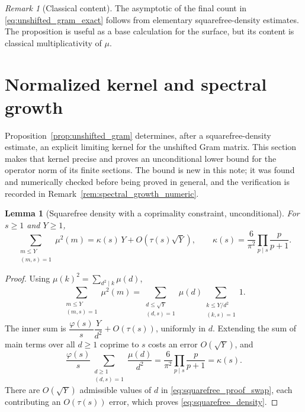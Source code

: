 \documentclass[11pt]{amsart}
\numberwithin{equation}{section}
\theoremstyle{plain}
\newtheorem{lemma}[theorem]{Lemma}
\theoremstyle{definition}
\theoremstyle{remark}
\newtheorem{remark}[theorem]{Remark}
\newcommand{\mob}{\mu}
\begin{document}
\begin{remark}[Classical content]
\label{rem:unshifted_classical}
The asymptotic of the final count in \eqref{eq:unshifted_gram_exact} follows from elementary squarefree-density estimates.  The proposition is useful as a base calculation for the surface, but its content is classical multiplicativity of \(\mob\).
\end{remark}

\section{Normalized kernel and spectral growth}
\label{sec:spectral_growth}

Proposition~\ref{prop:unshifted_gram} determines, after a squarefree-density estimate, an explicit limiting kernel for the unshifted Gram matrix.  This section makes that kernel precise and proves an unconditional lower bound for the operator norm of its finite sections.  The bound is new in this note; it was found and numerically checked before being proved in general, and the verification is recorded in Remark~\ref{rem:spectral_growth_numeric}.

\begin{lemma}[Squarefree density with a coprimality constraint, unconditional]
\label{lem:squarefree_density}
For \(s\ge1\) and \(Y\ge1\),
\begin{equation}
\sum_{\substack{m\le Y\\(m,s)=1}}\mob^2(m)=\kappa(s)\,Y+O\!\left(\tau(s)\sqrt Y\right),
\qquad
\kappa(s)=\frac6{\pi^2}\prod_{p\mid s}\frac p{p+1}.
\label{eq:squarefree_density}
\end{equation}
\end{lemma}

\begin{proof}
Using \(\mob(k)^2=\sum_{d^2\mid k}\mob(d)\),
\begin{equation}
\sum_{\substack{m\le Y\\(m,s)=1}}\mob^2(m)
=\sum_{\substack{d\le\sqrt Y\\(d,s)=1}}\mob(d)\sum_{\substack{k\le Y/d^2\\(k,s)=1}}1.
\label{eq:squarefree_proof_swap}
\end{equation}
The inner sum is \(\dfrac{\varphi(s)}{s}\dfrac Y{d^2}+O(\tau(s))\), uniformly in \(d\).  Extending the sum of main terms over all \(d\ge1\) coprime to \(s\) costs an error \(O(\sqrt Y)\), and
\begin{equation}
\frac{\varphi(s)}s\sum_{\substack{d\ge1\\(d,s)=1}}\frac{\mob(d)}{d^2}=\frac6{\pi^2}\prod_{p\mid s}\frac p{p+1}=\kappa(s).
\label{eq:kappa_evaluation}
\end{equation}
There are \(O(\sqrt Y)\) admissible values of \(d\) in \eqref{eq:squarefree_proof_swap}, each contributing an \(O(\tau(s))\) error, which proves \eqref{eq:squarefree_density}.
\end{proof}
\end{document}
